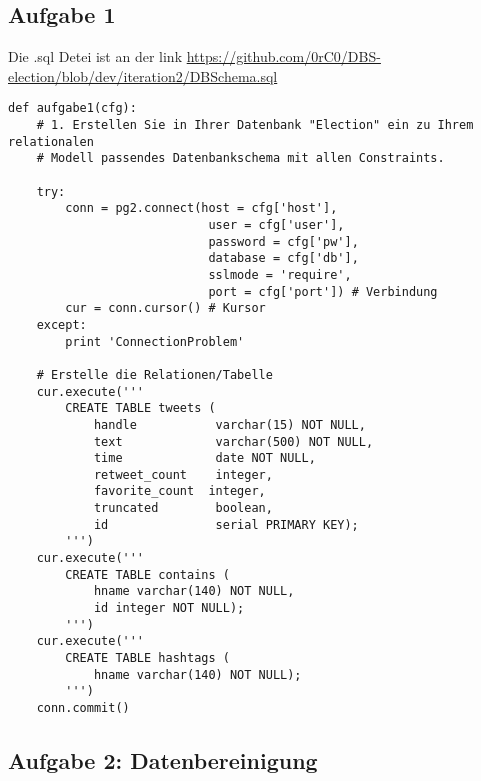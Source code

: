 \documentclass[a4paper]{article}
\begin{document}
\subsection{Aufgabe 1}
Die .sql Detei ist an der link \href{https://github.com/0rC0/DBS-election/blob/dev/iteration2/DBSchema.sql}{https://github.com/0rC0/DBS-election/blob/dev/iteration2/DBSchema.sql}
\begin{verbatim}
def aufgabe1(cfg):
    # 1. Erstellen Sie in Ihrer Datenbank "Election" ein zu Ihrem relationalen
    # Modell passendes Datenbankschema mit allen Constraints.

    try:
        conn = pg2.connect(host = cfg['host'],
                            user = cfg['user'],
                            password = cfg['pw'],
                            database = cfg['db'],
                            sslmode = 'require',
                            port = cfg['port']) # Verbindung
        cur = conn.cursor() # Kursor
    except:
        print 'ConnectionProblem'

    # Erstelle die Relationen/Tabelle
    cur.execute('''
        CREATE TABLE tweets (
            handle           varchar(15) NOT NULL,
            text             varchar(500) NOT NULL,
            time             date NOT NULL,
            retweet_count    integer,
            favorite_count  integer,
            truncated        boolean,
            id               serial PRIMARY KEY);
        ''')
    cur.execute('''
        CREATE TABLE contains (
            hname varchar(140) NOT NULL,
            id integer NOT NULL);
        ''')
    cur.execute('''
        CREATE TABLE hashtags (
            hname varchar(140) NOT NULL);
        ''')
    conn.commit()
\end{verbatim}
\subsection{Aufgabe 2: Datenbereinigung}
\end{document}
